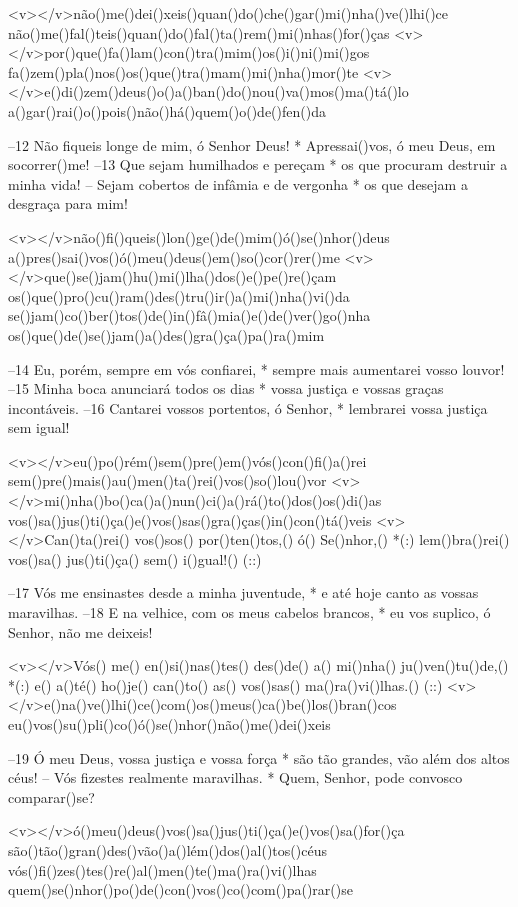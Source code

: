 <v></v>não()me()dei()xeis()quan()do()che()gar()mi()nha()ve()lhi()ce
não()me()fal()teis()quan()do()fal()ta()rem()mi()nhas()for()ças
<v></v>por()que()fa()lam()con()tra()mim()os()i()ni()mi()gos
fa()zem()pla()nos()os()que()tra()mam()mi()nha()mor()te
<v></v>e()di()zem()deus()o()a()ban()do()nou()va()mos()ma()tá()lo
a()gar()rai()o()pois()não()há()quem()o()de()fen()da

–12 Não fiqueis longe de mim, ó Senhor Deus! *
Apressai()vos, ó meu Deus, em socorrer()me!
–13 Que sejam humilhados e pereçam *
os que procuram destruir a minha vida!
– Sejam cobertos de infâmia e de vergonha *
os que desejam a desgraça para mim!

<v></v>não()fi()queis()lon()ge()de()mim()ó()se()nhor()deus
a()pres()sai()vos()ó()meu()deus()em()so()cor()rer()me
<v></v>que()se()jam()hu()mi()lha()dos()e()pe()re()çam
os()que()pro()cu()ram()des()tru()ir()a()mi()nha()vi()da
se()jam()co()ber()tos()de()in()fâ()mia()e()de()ver()go()nha
os()que()de()se()jam()a()des()gra()ça()pa()ra()mim

–14 Eu, porém, sempre em vós confiarei, *
sempre mais aumentarei vosso louvor!
–15 Minha boca anunciará todos os dias *
vossa justiça e vossas graças incontáveis.
–16 Cantarei vossos portentos, ó Senhor, *
lembrarei vossa justiça sem igual!

<v></v>eu()po()rém()sem()pre()em()vós()con()fi()a()rei
sem()pre()mais()au()men()ta()rei()vos()so()lou()vor
<v></v>mi()nha()bo()ca()a()nun()ci()a()rá()to()dos()os()di()as
vos()sa()jus()ti()ça()e()vos()sas()gra()ças()in()con()tá()veis
<v></v>Can()ta()rei() vos()sos() por()ten()tos,() ó() Se()nhor,() *(:)
lem()bra()rei() vos()sa() jus()ti()ça() sem() i()gual!() (::)

–17 Vós me ensinastes desde a minha juventude, *
e até hoje canto as vossas maravilhas.
–18 E na velhice, com os meus cabelos brancos, *
eu vos suplico, ó Senhor, não me deixeis!

<v></v>Vós() me() en()si()nas()tes() des()de() a() mi()nha() ju()ven()tu()de,() *(:)
e() a()té() ho()je() can()to() as() vos()sas() ma()ra()vi()lhas.() (::)
<v></v>e()na()ve()lhi()ce()com()os()meus()ca()be()los()bran()cos
eu()vos()su()pli()co()ó()se()nhor()não()me()dei()xeis

–19 Ó meu Deus, vossa justiça e vossa força *
são tão grandes, vão além dos altos céus!
– Vós fizestes realmente maravilhas. *
Quem, Senhor, pode convosco comparar()se?

<v></v>ó()meu()deus()vos()sa()jus()ti()ça()e()vos()sa()for()ça
são()tão()gran()des()vão()a()lém()dos()al()tos()céus
vós()fi()zes()tes()re()al()men()te()ma()ra()vi()lhas
quem()se()nhor()po()de()con()vos()co()com()pa()rar()se

